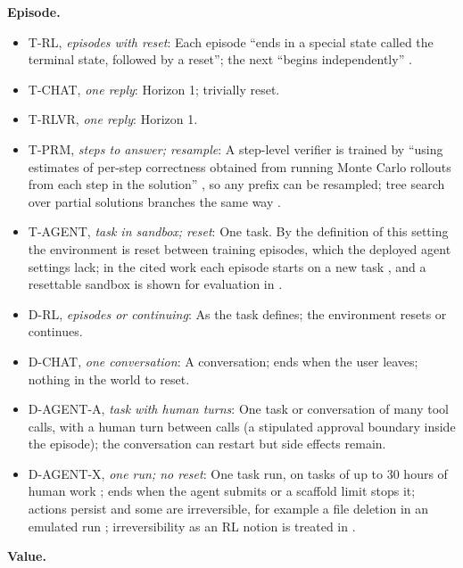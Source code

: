 \documentclass{article}
\providecommand{\tightlist}{\setlength{\itemsep}{0pt}\setlength{\parskip}{0pt}}
\begin{document}
\textbf{Episode.}

\begin{itemize}
\tightlist
\item
  T-RL, \emph{episodes with reset}: Each episode ``ends in a special state called the terminal state, followed by a reset''; the next ``begins independently'' \citep{sutton2018}.
\item
  T-CHAT, \emph{one reply}: Horizon 1; trivially reset.
\item
  T-RLVR, \emph{one reply}: Horizon 1.
\item
  T-PRM, \emph{steps to answer; resample}: A step-level verifier is trained by ``using estimates of per-step correctness obtained from running Monte Carlo rollouts from each step in the solution'' \citep{snell2024}, so any prefix can be resampled; tree search over partial solutions branches the same way \citep{yao2023a}.
\item
  T-AGENT, \emph{task in sandbox; reset}: One task. By the definition of this setting the environment is reset between training episodes, which the deployed agent settings lack; in the cited work each episode starts on a new task \citep{zhou2024b}, and a resettable sandbox is shown for evaluation in \citep{jimenez2024}.
\item
  D-RL, \emph{episodes or continuing}: As the task defines; the environment resets or continues.
\item
  D-CHAT, \emph{one conversation}: A conversation; ends when the user leaves; nothing in the world to reset.
\item
  D-AGENT-A, \emph{task with human turns}: One task or conversation of many tool calls, with a human turn between calls (a stipulated approval boundary inside the episode); the conversation can restart but side effects remain.
\item
  D-AGENT-X, \emph{one run; no reset}: One task run, on tasks of up to 30 hours of human work \citep{kwa2025}; ends when the agent submits or a scaffold limit stops it; actions persist and some are irreversible, for example a file deletion in an emulated run \citep{ruan2024}; irreversibility as an RL notion is treated in \citep{grinsztajn2021, sharma2022}.
\end{itemize}

\textbf{Value.}
\end{document}

